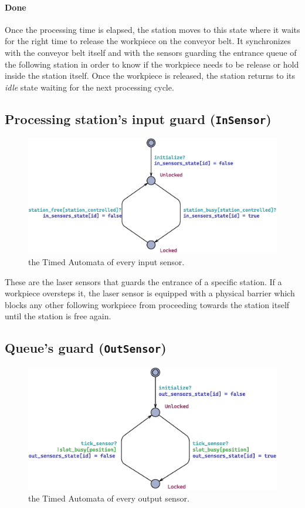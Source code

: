 \documentclass[a4paper]{article}
\begin{document}
    \paragraph{Done} Once the processing time is elapsed, the station moves to this state where it waits for the right time to release the workpiece on the conveyor belt. It synchronizes with the conveyor belt itself and with the sensors guarding the entrance queue of the following station in order to know if the workpiece needs to be release or hold inside the station itself. Once the workpiece is released, the station returns to its \textit{idle} state waiting for the next processing cycle.

    \subsection{Processing station's input guard (\texttt{InSensor})}

    \begin{figure}[h!]
        \centering
        \includegraphics[width=0.5\columnwidth]{./images/automata/in_sensor}
        \caption{the Timed Automata of every input sensor.}
    \end{figure}

    These are the laser sensors that guards the entrance of a specific station. If a workpiece oversteps it, the laser sensor is equipped with a physical barrier which blocks any other following workpiece from proceeding towards the station itself until the station is free again.

    \subsection{Queue's guard (\texttt{OutSensor})}

    \begin{figure}[h!]
        \centering
        \includegraphics[width=0.45\columnwidth]{./images/automata/out_sensor}
        \caption{the Timed Automata of every output sensor.}
    \end{figure}
\end{document}
